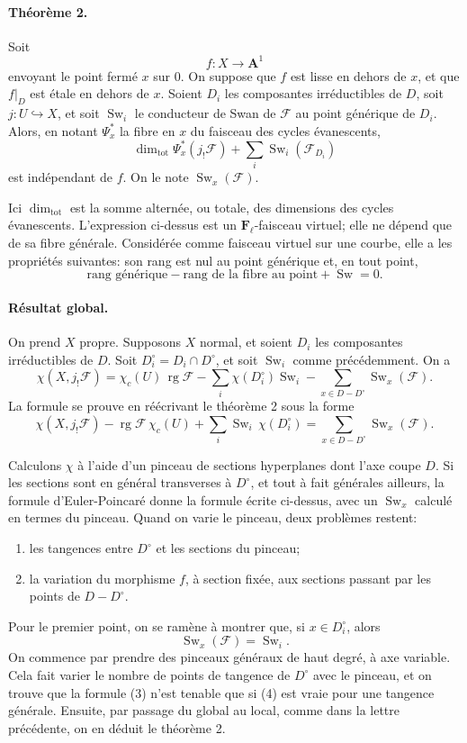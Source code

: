 \documentclass[11pt]{article}
\newcommand{\F}{\mathcal F}
\newcommand{\Fell}{\mathbf F_\ell}
\newcommand{\A}{\mathbf A}
\DeclareMathOperator{\Sw}{Sw}
\DeclareMathOperator{\rk}{rg}
\DeclareMathOperator{\Tot}{tot}
\begin{document}
\paragraph{Théorème 2.}
Soit
\[
  f:X\longrightarrow \A^1
\]
envoyant le point fermé \(x\) sur \(0\). On suppose que \(f\) est lisse en dehors de \(x\), et que \(f|_D\) est étale en dehors de \(x\). Soient \(D_i\) les composantes irréductibles de \(D\), soit \(j:U\hookrightarrow X\), et soit \(\Sw_i\) le conducteur de Swan de \(\F\) au point générique de \(D_i\). Alors, en notant \(\Psi_x^*\) la fibre en \(x\) du faisceau des cycles évanescents,
\[
  \dim_{\Tot}\Psi_x^*(j_!\F)
  +\sum_i \Sw_i(\F_{D_i})
\tag{2}
\]
est indépendant de \(f\). On le note \(\Sw_x(\F)\).

Ici \(\dim_{\Tot}\) est la somme alternée, ou totale, des dimensions des cycles évanescents. L'expression ci-dessus est un \(\Fell\)-faisceau virtuel; elle ne dépend que de sa fibre générale. Considérée comme faisceau virtuel sur une courbe, elle a les propriétés suivantes: son rang est nul au point générique et, en tout point,
\[
  \text{rang générique}-\text{rang de la fibre au point}+\Sw=0.
\]

\paragraph{Résultat global.}
On prend \(X\) propre. Supposons \(X\) normal, et soient \(D_i\) les composantes irréductibles de \(D\). Soit \(D_i^\circ=D_i\cap D^\circ\), et soit \(\Sw_i\) comme précédemment. On a
\[
  \chi(X,j_!\F)
  =\chi_c(U)\,\rk\F
   -\sum_i \chi(D_i^\circ)\Sw_i
   -\sum_{x\in D-D^\circ}\Sw_x(\F).
\tag{3}
\]
La formule se prouve en réécrivant le théorème 2 sous la forme
\[
  \chi(X,j_!\F)-\rk\F\,\chi_c(U)
  +\sum_i \Sw_i\,\chi(D_i^\circ)
  =\sum_{x\in D-D^\circ}\Sw_x(\F).
\]

Calculons \(\chi\) à l'aide d'un pinceau de sections hyperplanes dont l'axe coupe \(D\). Si les sections sont en général transverses à \(D^\circ\), et tout à fait générales ailleurs, la formule d'Euler-Poincaré donne la formule écrite ci-dessus, avec un \(\Sw_x\) calculé en termes du pinceau. Quand on varie le pinceau, deux problèmes restent:
\begin{enumerate}[label=\alph*)]
\item les tangences entre \(D^\circ\) et les sections du pinceau;
\item la variation du morphisme \(f\), à section fixée, aux sections passant par les points de \(D-D^\circ\).
\end{enumerate}
Pour le premier point, on se ramène à montrer que, si \(x\in D_i^\circ\), alors
\[
  \Sw_x(\F)=\Sw_i.
\tag{4}
\]
On commence par prendre des pinceaux généraux de haut degré, à axe variable. Cela fait varier le nombre de points de tangence de \(D^\circ\) avec le pinceau, et on trouve que la formule (3) n'est tenable que si (4) est vraie pour une tangence générale. Ensuite, par passage du global au local, comme dans la lettre précédente, on en déduit le théorème 2.
\end{document}
